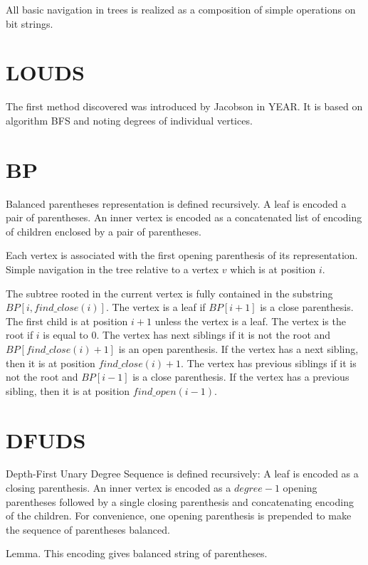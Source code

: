 All basic navigation in trees is realized as a composition of simple operations on bit strings.





\section{LOUDS}

The first method discovered was introduced by Jacobson in YEAR.
It is based on algorithm BFS and noting degrees of individual vertices.


\section{BP}

Balanced parentheses representation is defined recursively.
A leaf is encoded a pair of parentheses.
An inner vertex is encoded as a concatenated list of encoding of children enclosed by a pair of parentheses.


Each vertex is associated with the first opening parenthesis of its representation.
Simple navigation in the tree relative to a vertex $v$ which is at position $i$.

The subtree rooted in the current vertex is fully contained in the substring $BP[i, find\_close(i)]$.
The vertex is a leaf if $BP[i+1]$ is a close parenthesis.
The first child is at position $i+1$ unless the vertex is a leaf.
The vertex is the root if $i$ is equal to $0$.
The vertex has next siblings if it is not the root and $BP[find\_close(i) + 1]$ is an open parenthesis.
If the vertex has a next sibling, then it is at position $find\_close(i) + 1$.
The vertex has previous siblings if it is not the root and $BP[i-1]$ is a close parenthesis.
If the vertex has a previous sibling, then it is at position $find\_open(i-1)$.

\section{DFUDS}

Depth-First Unary Degree Sequence is defined recursively:
A leaf is encoded as a closing parenthesis.
An inner vertex is encoded as a $degree-1$ opening parentheses followed by a single closing parenthesis and concatenating encoding of the children.
For convenience, one opening parenthesis is prepended to make the sequence of parentheses balanced.

Lemma.
This encoding gives balanced string of parentheses.
